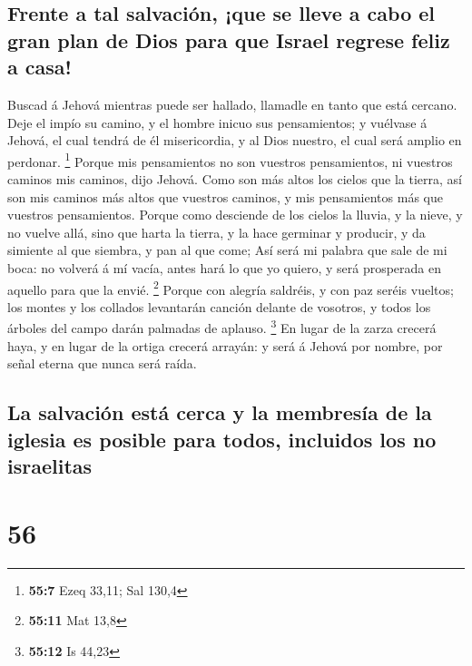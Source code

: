 \hypertarget{frente-a-tal-salvaciuxf3n-que-se-lleve-a-cabo-el-gran-plan-de-dios-para-que-israel-regrese-feliz-a-casa}{%
\subsection{Frente a tal salvación, ¡que se lleve a cabo el gran plan de
Dios para que Israel regrese feliz a
casa!}\label{frente-a-tal-salvaciuxf3n-que-se-lleve-a-cabo-el-gran-plan-de-dios-para-que-israel-regrese-feliz-a-casa}}

 Buscad á Jehová mientras puede ser hallado, llamadle en
tanto que está cercano.  Deje el impío su camino, y el
hombre inicuo sus pensamientos; y vuélvase á Jehová, el cual tendrá de
él misericordia, y al Dios nuestro, el cual será amplio en perdonar.
\footnote{\textbf{55:7} Ezeq 33,11; Sal 130,4}  Porque mis
pensamientos no son vuestros pensamientos, ni vuestros caminos mis
caminos, dijo Jehová.  Como son más altos los cielos que la
tierra, así son mis caminos más altos que vuestros caminos, y mis
pensamientos más que vuestros pensamientos.  Porque como
desciende de los cielos la lluvia, y la nieve, y no vuelve allá, sino
que harta la tierra, y la hace germinar y producir, y da simiente al que
siembra, y pan al que come;  Así será mi palabra que sale
de mi boca: no volverá á mí vacía, antes hará lo que yo quiero, y será
prosperada en aquello para que la envié. \footnote{\textbf{55:11} Mat
  13,8}  Porque con alegría saldréis, y con paz seréis
vueltos; los montes y los collados levantarán canción delante de
vosotros, y todos los árboles del campo darán palmadas de aplauso.
\footnote{\textbf{55:12} Is 44,23}  En lugar de la zarza
crecerá haya, y en lugar de la ortiga crecerá arrayán: y será á Jehová
por nombre, por señal eterna que nunca será raída.

\hypertarget{la-salvaciuxf3n-estuxe1-cerca-y-la-membresuxeda-de-la-iglesia-es-posible-para-todos-incluidos-los-no-israelitas}{%
\subsection{La salvación está cerca y la membresía de la iglesia es
posible para todos, incluidos los no
israelitas}\label{la-salvaciuxf3n-estuxe1-cerca-y-la-membresuxeda-de-la-iglesia-es-posible-para-todos-incluidos-los-no-israelitas}}

\hypertarget{section-55}{%
\section{56}\label{section-55}}

